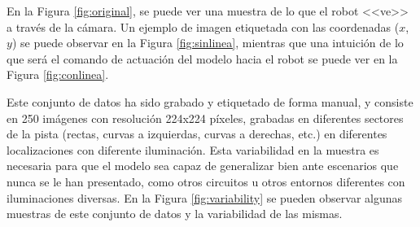 En la Figura \ref{fig:original}, se puede ver una muestra de lo que el robot <<ve>> a través de la cámara. Un ejemplo de imagen etiquetada con las coordenadas ($x$, $y$) se puede observar en la Figura \ref{fig:sinlinea}, mientras que una intuición de lo que será el comando de actuación del modelo hacia el robot se puede ver en la Figura \ref{fig:conlinea}.

Este conjunto de datos ha sido grabado y etiquetado de forma manual, y consiste en 250 imágenes con resolución 224x224 píxeles, grabadas en diferentes sectores de la pista (rectas, curvas a izquierdas, curvas a derechas, etc.) en diferentes localizaciones con diferente iluminación. Esta variabilidad en la muestra es necesaria para que el modelo sea capaz de generalizar bien ante escenarios que nunca se le han presentado, como otros circuitos u otros entornos diferentes con iluminaciones diversas. En la Figura \ref{fig:variability} se pueden observar algunas muestras de este conjunto de datos y la variabilidad de las mismas.

